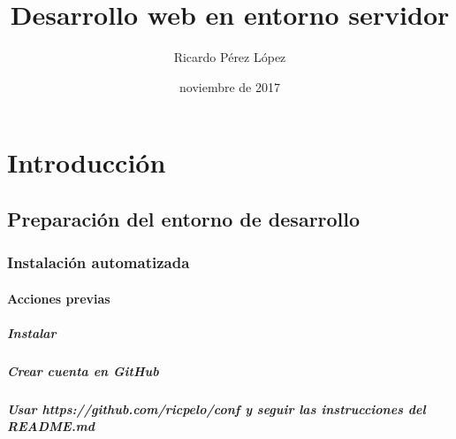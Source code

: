 \documentclass[a4paper,11pt,spanish]{sphinxmanual}
\title{Desarrollo web en entorno servidor}
\date{noviembre de 2017}
\author{Ricardo Pérez López}
\begin{document}
\maketitle
\sphinxtableofcontents
{}\label{\detokenize{index_latex::doc}}



\part{Introducción}
\label{\detokenize{introduccion:introduccion}}\label{\detokenize{introduccion:desarrollo-web-en-entorno-servidor}}\label{\detokenize{introduccion::doc}}

\chapter{Preparación del entorno de desarrollo}
\label{\detokenize{introduccion:preparacion-del-entorno-de-desarrollo}}

\section{Instalación automatizada}
\label{\detokenize{introduccion:instalacion-automatizada}}

\subsection{Acciones previas}
\label{\detokenize{introduccion:acciones-previas}}

\subsubsection{Instalar }
\label{\detokenize{introduccion:instalar-git}}

\subsubsection{Crear cuenta en GitHub}
\label{\detokenize{introduccion:crear-cuenta-en-github}}

\subsubsection{Usar https://github.com/ricpelo/conf y seguir las instrucciones del README.md}
\label{\detokenize{introduccion:usar-https-github-com-ricpelo-conf-y-seguir-las-instrucciones-del-readme-md}}
\end{document}
